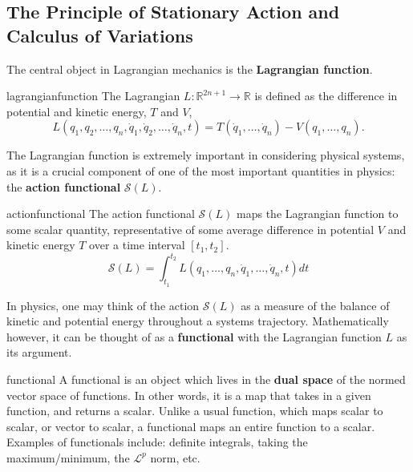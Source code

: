 \subsection{The Principle of Stationary Action and Calculus of Variations}

The central object in Lagrangian mechanics is the \textbf{Lagrangian function}.

\begin{smjdefinition}{lagrangianfunction}
	The Lagrangian $L:\mathbb{R}^{2n+1}\to\mathbb{R}$ is defined as the difference in potential and kinetic energy, $T$ and $V$,
	$$L(q_1, q_2, \ldots, q_n, \dot{q}_1, \dot{q}_2, \ldots, \dot{q}_n, t) = T(\dot q_1, \ldots, \dot q_n) - V(q_1, \ldots, q_n).$$
\end{smjdefinition}

\vspace{1em}

The Lagrangian function is extremely important in considering physical systems, as it is a crucial component of one of the most important quantities in physics: the \textbf{action functional} $\mathcal{S}(L)$. 

\begin{smjdefinition}{actionfunctional}
	The action functional $\mathcal{S}(L)$ maps the Lagrangian function to some scalar quantity, representative of some average difference in potential $V$ and kinetic energy $T$ over a time interval $[t_1,t_2]$.
	$$\mathcal{S}(L)=\int_{t_1}^{t_2} L(q_1,\ldots,q_n, \dot q_1, \ldots, \dot q_n, t)dt$$
\end{smjdefinition}

In physics, one may think of the action $\mathcal{S}(L)$ as a measure of the balance of kinetic and potential energy throughout a systems trajectory. Mathematically however, it can be thought of as a \textbf{functional} with the Lagrangian function $L$ as its argument. 

\begin{smjdefinition}[Functional]{functional}
	A functional is an object which lives in the \textbf{dual space} of the normed vector space of functions. In other words, it is a map that takes in a given function, and returns a scalar. Unlike a usual function, which maps scalar to scalar, or vector to scalar, a functional maps an entire function to a scalar. Examples of functionals include: definite integrals, taking the maximum/minimum, the $\mathcal{L}^p$ norm, etc.
\end{smjdefinition}

